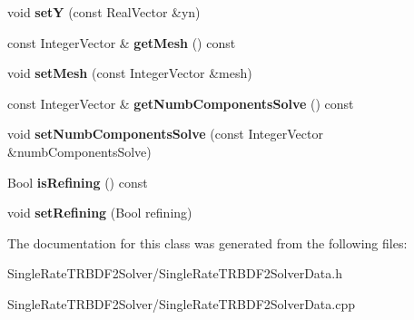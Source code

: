 \begin{DoxyCompactItemize}
\item 
\hypertarget{classSingleRateTRBDF2SolverData_a23f5ac0c1b29ae58e62806022f8bcbbe}{
void {\bfseries setY} (const RealVector \&yn)}
\label{classSingleRateTRBDF2SolverData_a23f5ac0c1b29ae58e62806022f8bcbbe}

\item 
\hypertarget{classSingleRateTRBDF2SolverData_acae22cf473ad1fbc93648b1dfeee8210}{
const IntegerVector \& {\bfseries getMesh} () const }
\label{classSingleRateTRBDF2SolverData_acae22cf473ad1fbc93648b1dfeee8210}

\item 
\hypertarget{classSingleRateTRBDF2SolverData_a8b13e9a4427a55940b331b271f5aa568}{
void {\bfseries setMesh} (const IntegerVector \&mesh)}
\label{classSingleRateTRBDF2SolverData_a8b13e9a4427a55940b331b271f5aa568}

\item 
\hypertarget{classSingleRateTRBDF2SolverData_a7acc7fa4971888b02a68887579eaec72}{
const IntegerVector \& {\bfseries getNumbComponentsSolve} () const }
\label{classSingleRateTRBDF2SolverData_a7acc7fa4971888b02a68887579eaec72}

\item 
\hypertarget{classSingleRateTRBDF2SolverData_a3eb4bd15d699f1e72f3871fa115ba1fc}{
void {\bfseries setNumbComponentsSolve} (const IntegerVector \&numbComponentsSolve)}
\label{classSingleRateTRBDF2SolverData_a3eb4bd15d699f1e72f3871fa115ba1fc}

\item 
\hypertarget{classSingleRateTRBDF2SolverData_adb6bf2a597a12c7759f51f810bc2b401}{
Bool {\bfseries isRefining} () const }
\label{classSingleRateTRBDF2SolverData_adb6bf2a597a12c7759f51f810bc2b401}

\item 
\hypertarget{classSingleRateTRBDF2SolverData_ac11077f8a3c4021d6d80d1b691304797}{
void {\bfseries setRefining} (Bool refining)}
\label{classSingleRateTRBDF2SolverData_ac11077f8a3c4021d6d80d1b691304797}

\end{DoxyCompactItemize}


The documentation for this class was generated from the following files:\begin{DoxyCompactItemize}
\item 
SingleRateTRBDF2Solver/SingleRateTRBDF2SolverData.h\item 
SingleRateTRBDF2Solver/SingleRateTRBDF2SolverData.cpp\end{DoxyCompactItemize}
